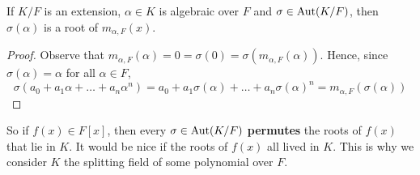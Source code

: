 \documentclass[12pt]{article}
\begin{document}
\begin{lemma}
    If $K/F$ is an extension, $\alpha\in K$ is algebraic over $F$ and $\sigma\in \operatorname{Aut}(K/F)$, then $\sigma(\alpha)$ is a root of $m_{\alpha,F}(x)$.
\end{lemma}
\begin{proof}
    Observe that $m_{\alpha,F}(\alpha)=0=\sigma(0)=\sigma(m_{\alpha,F}(\alpha))$. Hence, since $\sigma(\alpha)=\alpha$ for all $\alpha\in F$, $$\sigma(a_0+a_1\alpha+\dots +a_n\alpha^n)=a_0+a_1\sigma(\alpha)+\dots + a_n\sigma(\alpha)^n=m_{\alpha,F}(\sigma(\alpha))$$
\end{proof}

So if $f(x)\in F[x]$, then every $\sigma\in \operatorname{Aut}(K/F)$ \textbf{permutes} the roots of $f(x)$ that lie in $K$. It would be nice if the roots of $f(x)$ all lived in $K$. This is why we consider $K$ the splitting field of some polynomial over $F$.
\end{document}
